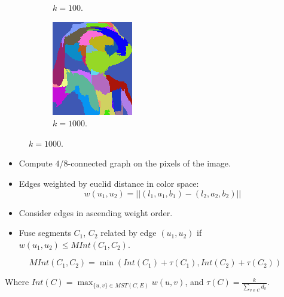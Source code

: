\documentclass{beamer}
\begin{document}
\begin{frame}
\begin{figure}[htb!]
\begin{subfigure}{.3\textwidth}
\caption{$k = 100$.}
\label{fig:smallKSegmentation}
\end{subfigure}
\begin{subfigure}{.3\textwidth}
\includegraphics[width=\textwidth]{../images/luffyK1000.png}
\caption{$k = 1000$.}
\label{fig:largeKSegmentation}
\end{subfigure}
\end{figure}

\end{frame}

\begin{frame}
\begin{itemize}
\item Compute $4$/$8$-connected graph on the pixels of the image.
\item Edges weighted by euclid distance in color space:
\[
w(u_1, u_2) = ||(l_1,a_1,b_1) - (l_2,a_2,b_2)||
\]
\item Consider edges in ascending weight order.
\item Fuse segments $C_1$, $C_2$ related by edge $(u_1,u_2)$ if $w(u_1,u_2) \leq MInt(C_1, C_2)$.
\end{itemize}

\[
MInt(C_1, C_2) = \min(Int(C_1) + \tau(C_1), Int(C_2) + \tau(C_2))
\]

Where $Int(C) = \max_{\{u,v\} \in MST(C, E)} w(u,v)$, and $\tau(C) = \frac{k}{\sum_{v \in C} d_v}$.

\end{frame}
\end{document}
